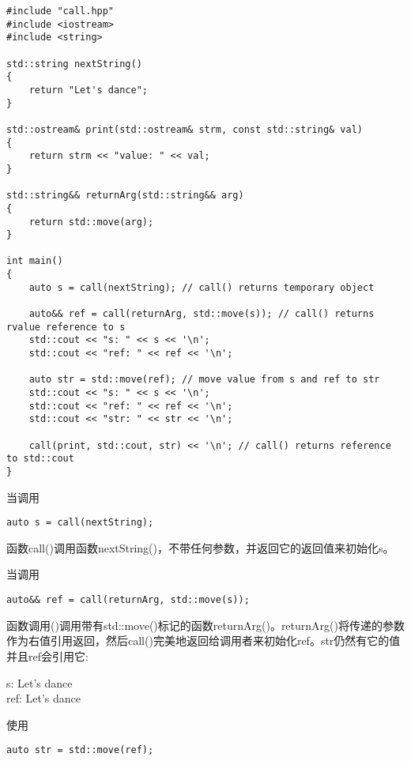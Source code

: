 \begin{lstlisting}[caption={}]
#include "call.hpp"
#include <iostream>
#include <string>

std::string nextString()
{
	return "Let's dance";
}

std::ostream& print(std::ostream& strm, const std::string& val)
{
	return strm << "value: " << val;
}

std::string&& returnArg(std::string&& arg)
{
	return std::move(arg);
}

int main()
{
	auto s = call(nextString); // call() returns temporary object
	
	auto&& ref = call(returnArg, std::move(s)); // call() returns rvalue reference to s
	std::cout << "s: " << s << '\n';
	std::cout << "ref: " << ref << '\n';
	
	auto str = std::move(ref); // move value from s and ref to str
	std::cout << "s: " << s << '\n';
	std::cout << "ref: " << ref << '\n';
	std::cout << "str: " << str << '\n';
	
	call(print, std::cout, str) << '\n'; // call() returns reference to std::cout
}
\end{lstlisting}

当调用\par

\begin{lstlisting}[caption={}]
	auto s = call(nextString);
\end{lstlisting}

函数call()调用函数nextString()，不带任何参数，并返回它的返回值来初始化s。\par

当调用\par

\begin{lstlisting}[caption={}]
	auto&& ref = call(returnArg, std::move(s));
\end{lstlisting}

函数调用()调用带有std::move()标记的函数returnArg()。returnArg()将传递的参数作为右值引用返回，然后call()完美地返回给调用者来初始化ref。str仍然有它的值并且ref会引用它:\par

\begin{tcolorbox}[colback=white,colframe=black]
s: Let's dance \\
ref: Let's dance
\end{tcolorbox}

使用\par

\begin{lstlisting}[caption={}]
auto str = std::move(ref);
\end{lstlisting}

